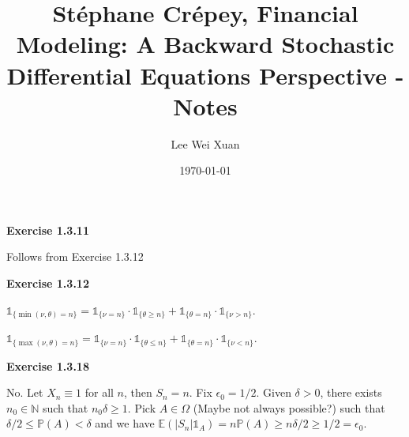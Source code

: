 \documentclass[12pt]{article}
\title{Stéphane Crépey, Financial Modeling: A Backward Stochastic 
Differential Equations Perspective - Notes}
\author{Lee Wei Xuan}
\date{\today}
\begin{document}
\maketitle

\textbf{Exercise 1.3.11}

Follows from Exercise 1.3.12



\textbf{Exercise 1.3.12}

$\mathds{1}_{\{\min(\nu, \theta) = n\}} = \mathds{1}_{\{\nu = n\}}\cdot \mathds{1}_{\{\theta \geq n\}} + \mathds{1}_{\{\theta = n\}}\cdot \mathds{1}_{\{\nu > n\}}$.

$\mathds{1}_{\{\max(\nu, \theta) = n\}} = \mathds{1}_{\{\nu = n\}}\cdot \mathds{1}_{\{\theta \leq n\}} + \mathds{1}_{\{\theta = n\}}\cdot \mathds{1}_{\{\nu < n\}}$.

\textbf{Exercise 1.3.18}

No. Let $X_n \equiv 1$ for all $n$, then $S_n = n$. Fix $\epsilon_0 = 1/2$. Given $\delta > 0$, there exists $n_0 \in \mathds{N}$ such that $n_0\delta \geq 1$. Pick $A \in \Omega$ (Maybe not always possible?) such that $\delta/2 \leq \mathds{P}(A) < \delta$ and we have $\mathds{E}(|S_n|\mathds{1}_A) = n\mathds{P}(A) \geq n\delta/2 \geq 1/2 = \epsilon_0$.
\end{document}
